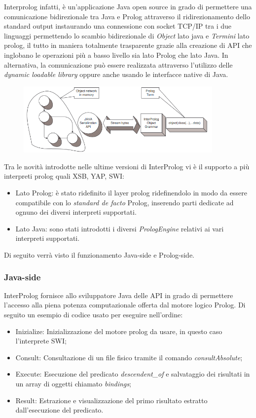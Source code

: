 Interprolog infatti, è un'applicazione Java open source in grado di permettere una comunicazione bidirezionale tra Java e Prolog attraverso il ridirezionamento dello standard output instaurando una connessione con socket TCP/IP tra i due linguaggi permettendo lo scambio bidirezionale di \emph{Object} lato java e \emph{Termini} lato prolog, il tutto in maniera totalmente trasparente grazie alla creazione di API che inglobano le operazioni più a basso livello sia lato Prolog che lato Java. In alternativa, la comunicazione può essere realizzata attraverso l'utilizzo delle \emph{dynamic loadable library} oppure anche usando le interfacce native di Java.

\begin{figure}[H]
	\centering
	\includegraphics[width=0.9\textwidth]{img/InterPrologSystem.png}
\end{figure}

Tra le novità introdotte nelle ultime versioni di InterProlog vi è il supporto a più interpreti prolog quali XSB, YAP, SWI:
\begin{itemize}
	\item Lato Prolog: è stato ridefinito il layer prolog ridefinendolo in modo da essere compatibile con lo \emph{standard de facto} Prolog, inserendo parti dedicate ad ognuno dei diversi interpreti supportati.
	\item Lato Java: sono stati introdotti i diversi \emph{PrologEngine} relativi ai vari interpreti supportati.
\end{itemize}

Di seguito verrà visto il funzionamento Java-side e Prolog-side.
\subsubsection*{Java-side}
InterProlog fornisce allo sviluppatore Java delle API in grado di permettere l'accesso alla piena potenza computazionale offerta dal motore logico Prolog. Di seguito un esempio di codice usato per eseguire nell'ordine:
\begin{itemize}
	\item Inizialize: Inizializzazione del motore prolog da usare, in questo caso l'interprete SWI;
	\item Consult: Consultazione di un file fisico tramite il comando \emph{consultAbsolute};
	\item Execute: Esecuzione del predicato \emph{descendent\_of} e salvataggio dei risultati in un array di oggetti chiamato \emph{bindings};
	\item Result: Estrazione e visualizzazione del primo risultato estratto dall'esecuzione del predicato.
\end{itemize}

